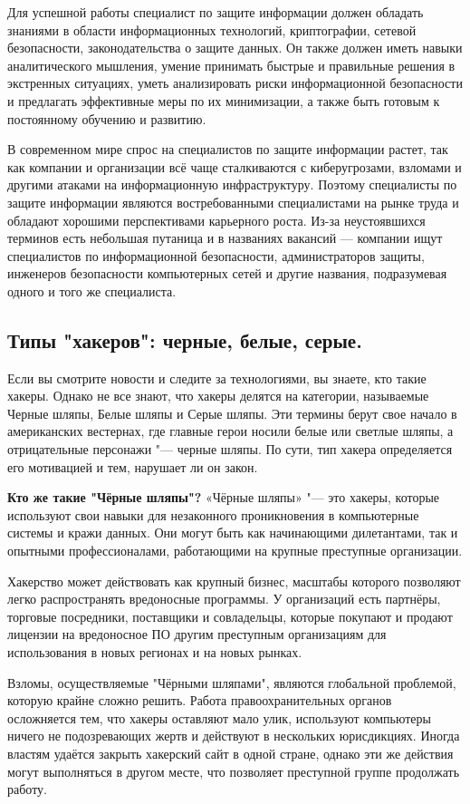 Для успешной работы специалист по защите информации должен обладать знаниями в области информационных технологий, 
криптографии, сетевой безопасности, законодательства о защите данных. Он также должен иметь навыки аналитического мышления, 
умение принимать быстрые и правильные решения в экстренных ситуациях, уметь анализировать риски информационной безопасности и 
предлагать эффективные меры по их минимизации, а также быть готовым к постоянному обучению и развитию.

В современном мире спрос на специалистов по защите информации растет, так как компании и организации всё чаще сталкиваются с 
киберугрозами, взломами и другими атаками на информационную инфраструктуру. Поэтому специалисты по защите информации являются 
востребованными специалистами на рынке труда и обладают хорошими перспективами карьерного роста.
Из-за неустоявшихся терминов есть небольшая путаница и в названиях вакансий — компании ищут специалистов по информационной 
безопасности, администраторов защиты, инженеров безопасности компьютерных сетей и другие названия, подразумевая одного и того 
же специалиста.
\newpage
\subsection{Типы "хакеров": черные, белые, серые.}
Если вы смотрите новости и следите за технологиями, вы знаете, кто такие хакеры. Однако не все знают, что хакеры делятся на категории, называемые Черные шляпы, Белые шляпы и Серые шляпы. Эти термины берут свое начало в американских вестернах, где главные герои носили белые или светлые шляпы, а отрицательные персонажи "---  черные шляпы.
По сути, тип хакера определяется его мотивацией и тем, нарушает ли он закон.

\textbf{Кто же такие "Чёрные шляпы"?}
«Чёрные шляпы» "---  это хакеры, которые используют свои навыки для незаконного проникновения в компьютерные системы и кражи данных. Они могут быть как начинающими дилетантами, так и опытными профессионалами, работающими на крупные преступные организации.

Хакерство может действовать как крупный бизнес, масштабы которого позволяют легко распространять вредоносные программы. У организаций есть партнёры, торговые посредники, поставщики и совладельцы, которые покупают и продают лицензии на вредоносное ПО другим преступным организациям для использования в новых регионах и на новых рынках.

Взломы, осуществляемые "Чёрными шляпами", являются глобальной проблемой, которую крайне сложно решить. Работа 
правоохранительных органов осложняется тем, что хакеры оставляют мало улик, используют компьютеры ничего не подозревающих 
жертв и действуют в нескольких юрисдикциях. Иногда властям удаётся закрыть хакерский сайт в одной стране, однако эти же 
действия могут выполняться в другом месте, что позволяет преступной группе продолжать работу.

